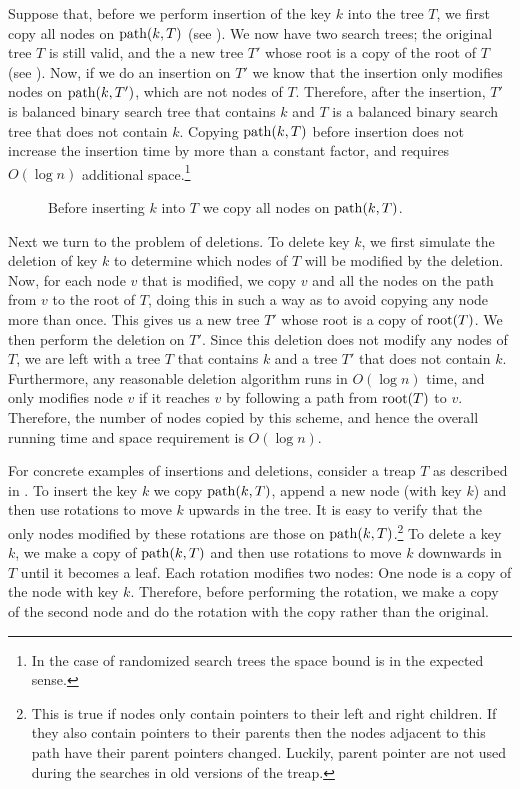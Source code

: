 Suppose that, before we perform insertion of the key $k$ into the tree
$T$, we first copy all nodes on $\mathrm{path}(k, T)$ (see
).  We now have two search trees; the original tree
$T$ is still valid, and the a new tree $T'$ whose root is a copy of
the root of $T$ (see ).  Now, if we do an insertion
on $T'$ we know that the insertion only modifies nodes on
$\mathrm{path}(k,T')$, which are not nodes of $T$.  Therefore, after the
insertion, $T'$ is balanced binary search tree that contains $k$ and
$T$ is a balanced binary search tree that does not contain $k$.
Copying $\mathrm{path}(k,T)$ before insertion does not increase the insertion
time by more than a constant factor, and requires $O(\log n)$
additional space.\footnote{In the case of randomized search trees the
space bound is in the expected sense.}

\begin{figure}
\caption{Before inserting $k$ into $T$ we copy all nodes on $\mathrm{path}(k,T)$.}
\end{figure}


Next we turn to the problem of deletions.  To delete key $k$, we first
simulate the deletion of key $k$ to determine which nodes of $T$ will
be modified by the deletion.  Now, for each node $v$ that is modified,
we copy $v$ and all the nodes on the path from $v$ to the root of $T$,
doing this in such a way as to avoid copying any node more than once.
This gives us a new tree $T'$ whose root is a copy of $\mathrm{root}(T)$.  We
then perform the deletion on $T'$.  Since this deletion does not
modify any nodes of $T$, we are left with a tree $T$ that contains $k$
and a tree $T'$ that does not contain $k$.  Furthermore, any
reasonable deletion algorithm runs in $O(\log n)$ time, and only
modifies node $v$ if it reaches $v$ by following a path from $\mathrm{root}(T)$
to $v$.  Therefore, the number of nodes copied by this scheme, and
hence the overall running time and space requirement is $O(\log n)$.

For concrete examples of insertions and deletions, consider a treap
$T$ as described in .  To insert the key $k$ we copy
$\mathrm{path}(k,T)$, append a new node (with key $k$) and then use rotations
to move $k$ upwards in the tree.  It is easy to verify that the only
nodes modified by these rotations are those on
$\mathrm{path}(k,T)$.\footnote{This is true if nodes only contain pointers to
their left and right children. If they also contain pointers to their
parents then the nodes adjacent to this path have their parent pointers
changed.  Luckily, parent pointer are not used during the searches
in old versions of the treap.}  To
delete a key $k$, we make a copy of $\mathrm{path}(k,T)$ and then use
rotations to move $k$ downwards in $T$ until it becomes a leaf.  Each
rotation modifies two nodes: One node is a copy of the node with key
$k$.  Therefore, before performing the rotation, we make a copy of the
second node and do the rotation with the copy rather than the
original.

